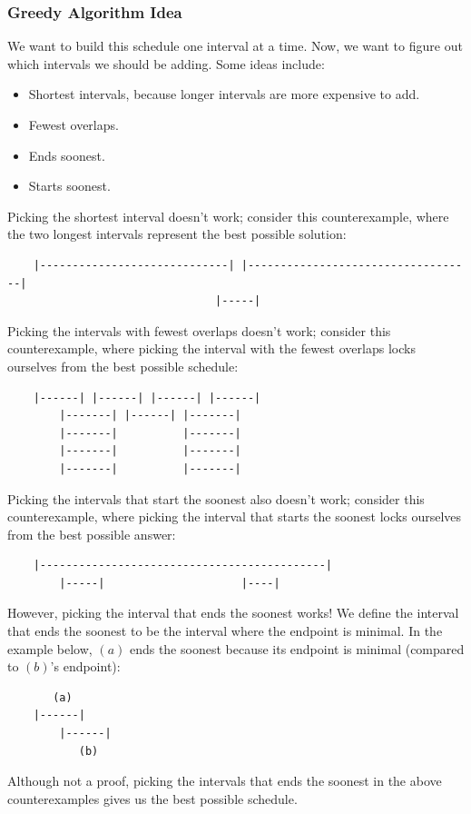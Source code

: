 \documentclass[letterpaper]{article}
\begin{document}
\subsubsection{Greedy Algorithm Idea}
We want to build this schedule one interval at a time. Now, we want to figure out which intervals we should be adding. Some ideas include: 
\begin{itemize}
    \item Shortest intervals, because longer intervals are more expensive to add. 
    \item Fewest overlaps. 
    \item Ends soonest. 
    \item Starts soonest. 
\end{itemize}
Picking the shortest interval doesn't work; consider this counterexample, where the two longest intervals represent the best possible solution:
\begin{verbatim}
    |-----------------------------| |-----------------------------------|
                                |-----|
\end{verbatim}
Picking the intervals with fewest overlaps doesn't work; consider this counterexample, where picking the interval with the fewest overlaps locks ourselves from the best possible schedule: 
\begin{verbatim}
    |------| |------| |------| |------|
        |-------| |------| |-------|
        |-------|          |-------|
        |-------|          |-------|
        |-------|          |-------|
\end{verbatim}
Picking the intervals that start the soonest also doesn't work; consider this counterexample, where picking the interval that starts the soonest locks ourselves from the best possible answer: 
\begin{verbatim}
    |--------------------------------------------|
        |-----|                     |----|
\end{verbatim}
However, picking the interval that ends the soonest works! We define the interval that ends the soonest to be the interval where the endpoint is minimal. In the example below, $(a)$ ends the soonest because its endpoint is minimal (compared to $(b)$'s endpoint):
\begin{verbatim}
       (a)
    |------|
        |------|
           (b)
\end{verbatim}
Although not a proof, picking the intervals that ends the soonest in the above counterexamples gives us the best possible schedule.
\end{document}
